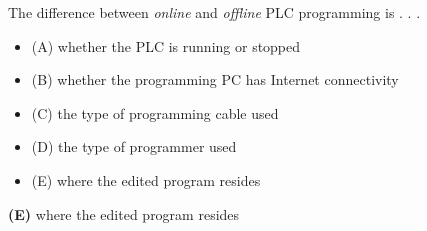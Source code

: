 

The difference between {\it online} and {\it offline} PLC programming is . . .

\begin{itemize}
\item{(A)} whether the PLC is running or stopped
\vskip 5pt 
\item{(B)} whether the programming PC has Internet connectivity
\vskip 5pt 
\item{(C)} the type of programming cable used
\vskip 5pt 
\item{(D)} the type of programmer used
\vskip 5pt 
\item{(E)} where the edited program resides
\end{itemize}







{\bf (E)} where the edited program resides
 










